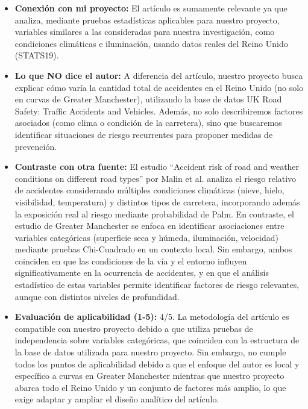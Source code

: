 \documentclass[12pt]{article}
\begin{document}
\begin{itemize}
    \item \textbf{Conexión con mi proyecto:} El artículo es sumamente relevante ya que analiza, mediante pruebas estadísticas aplicables para nuestro proyecto, variables similares a las consideradas para nuestra investigación, como condiciones climáticas e iluminación, usando datos reales del Reino Unido (STATS19). 
    
	\item \textbf{Lo que NO dice el autor:} A diferencia del artículo, nuestro proyecto busca explicar cómo varía la cantidad total de accidentes en el Reino Unido (no solo en curvas de Greater Manchester), utilizando la base de datos UK Road Safety: Traffic Accidents and Vehicles. Además, no solo describiremos factores asociados (como clima o condición de la carretera), sino que buscaremos identificar situaciones de riesgo recurrentes para proponer medidas de prevención. 
    
	\item \textbf{Contraste con otra fuente:} El estudio “Accident risk of road and weather conditions on different road types” por Malin et al. analiza el riesgo relativo de accidentes considerando múltiples condiciones climáticas (nieve, hielo, visibilidad, temperatura) y distintos tipos de carretera, incorporando además la exposición real al riesgo mediante probabilidad de Palm. En contraste, el estudio de Greater Manchester se enfoca en identificar asociaciones entre variables categóricas (superficie seca y húmeda, iluminación, velocidad) mediante pruebas Chi-Cuadrado en un contexto local. Sin embargo, ambos coinciden en que las condiciones de la vía y el entorno influyen significativamente en la ocurrencia de accidentes, y en que el análisis estadístico de estas variables permite identificar factores de riesgo relevantes, aunque con distintos niveles de profundidad.  
    
	\item \textbf{Evaluación de aplicabilidad (1-5):} 4/5. La metodología del artículo es compatible con nuestro proyecto debido a que utiliza pruebas de independencia sobre variables categóricas, que coinciden con la estructura de la base de datos utilizada para nuestro proyecto. Sin embargo, no cumple todos los puntos de aplicabilidad debido a que el enfoque del autor es local y específico a curvas en Greater Manchester mientras que nuestro proyecto abarca todo el Reino Unido y un conjunto de factores más amplio, lo que exige adaptar y ampliar el diseño analítico del artículo.
    

\end{itemize}
\end{document}
